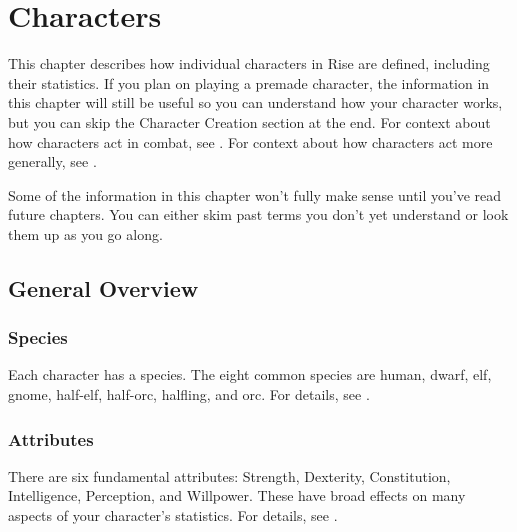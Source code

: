 \chapter{Characters}

This chapter describes how individual characters in Rise are defined, including their statistics.
If you plan on playing a premade character, the information in this chapter will still be useful so you can understand how your character works, but you can skip the Character Creation section at the end.
For context about how characters act in combat, see .
For context about how characters act more generally, see .

Some of the information in this chapter won't fully make sense until you've read future chapters.
You can either skim past terms you don't yet understand or look them up as you go along.

\section{General Overview}

    \subsection{Species}
        Each character has a species.
        The eight common species are human, dwarf, elf, gnome, half-elf, half-orc, halfling, and orc.
        For details, see .

    \subsection{Attributes}
        There are six fundamental attributes: Strength, Dexterity, Constitution, Intelligence, Perception, and Willpower.
        These have broad effects on many aspects of your character's statistics.
        For details, see .

